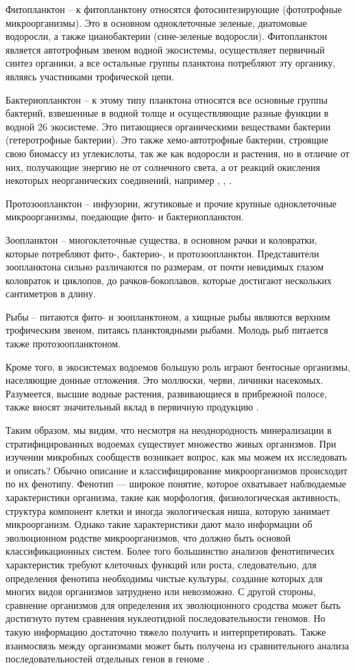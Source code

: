 Фитопланктон – к фитопланктону относятся фотосинтезирующие (фототрофные микроорганизмы). Это в основном одноклеточные зеленые, диатомовые водоросли, а также цианобактерии (сине-зеленые водоросли). Фитопланктон является автотрофным звеном водной
экосистемы, осуществляет первичный синтез органики, а все остальные группы планктона
потребляют эту органику, являясь участниками трофической цепи.

Бактериопланктон – к этому типу планктона относятся все основные группы бактерий,
взвешенные в водной толще и осуществляющие разные функции в водной 26 экосистеме.
Это питающиеся органическими веществами бактерии (гетеротрофные бактерии). Это также
хемо-автотрофные бактерии, строящие свою биомассу из углекислоты, так же как водоросли
и растения, но в отличие от них, получающие энергию не от солнечного света, а от реакций
окисления некоторых неорганических соединений, например ,  , .

Протозоопланктон – инфузории, жгутиковые и прочие крупные одноклеточные микроорганизмы, поедающие фито- и бактериопланктон.

Зоопланктон – многоклеточные существа, в основном рачки и коловратки, которые потребляют фито-, бактерио-, и протозоопланктон. Представители зоопланктона сильно различаются по размерам, от почти невидимых глазом коловраток и циклопов, до рачков-бокоплавов, которые достигают нескольких сантиметров в длину.

Рыбы – питаются фито- и зоопланктоном, а хищные рыбы являются верхним трофическим звеном, питаясь планктоядными рыбами. Молодь рыб питается также протозоопланктоном.

Кроме того, в экосистемах водоемов большую роль играют бентосные организмы, населяющие донные отложения. Это моллюски, черви, личинки насекомых. Разумеется, высшие
водные растения, развивающиеся в прибрежной полосе, также вносят значительный вклад
в первичную продукцию \cite{BioPhys10}.

Таким образом, мы видим, что несмотря на неоднородность минерализации в стратифицированных водоемах существует множество живых организмов. При изучении микробных
сообществ возникает вопрос, как мы можем их исследовать и описать? Обычно описание и
классифицирование микроорганизмов происходит по их фенотипу. Фенотип — широкое понятие, которое охватывает наблюдаемые характеристики организма, такие как морфология,
физиологическая активность, структура компонент клетки и иногда экологическая ниша,
которую занимает микроорганизм. Однако такие характеристики дают мало информации об
эволюционном родстве микроорганизмов, что должно быть основой классификационных систем. Более того большинство анализов фенотипичесих характеристик требуют клеточных
функций или роста, следовательно, для определения фенотипа необходимы чистые культуры, создание которых для многих видов организмов затруднено или невозможно. С другой
стороны, сравнение организмов для определения их эволюционного сродства может быть
достигнуто путем сравнения нуклеотидной последовательности геномов. Но такую информацию достаточно тяжело получить и интерпретировать. Также взаимосвязь между организмами может быть получена из сравнительного анализа последовательностей отдельных
генов в геноме \cite{Hugenholtz1996}.

